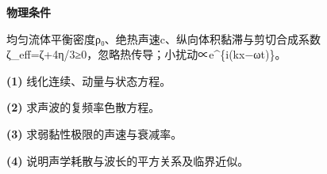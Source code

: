 \textbf{物理条件}\par 均匀流体平衡密度ρ₀、绝热声速c、纵向体积黏滞与剪切合成系数ζ\_eff=ζ+4η/3≥0，忽略热传导；小扰动∝e\textasciicircum{}\{i(kx−ωt)\}。
\par\noindent\textbf{(1)} 线化连续、动量与状态方程。
\par\noindent\textbf{(2)} 求声波的复频率色散方程。
\par\noindent\textbf{(3)} 求弱黏性极限的声速与衰减率。
\par\noindent\textbf{(4)} 说明声学耗散与波长的平方关系及临界近似。
